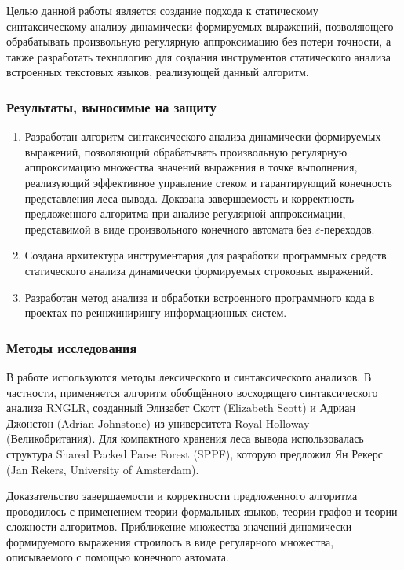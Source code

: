 Целью данной работы является создание подхода к статическому синтаксическому анализу динамически формируемых выражений, позволяющего обрабатывать произвольную регулярную аппроксимацию без потери точности, а также разработать технологию для создания инструментов статического анализа встроенных текстовых языков, реализующей данный алгоритм.

\subsubsection*{\large{Результаты, выносимые на защиту}}
\begin{enumerate}
    \item Разработан алгоритм синтаксического анализа динамически формируемых выражений, позволяющий обрабатывать произвольную регулярную аппроксимацию множества значений выражения в точке выполнения, реализующий 
    эффективное управление стеком и гарантирующий конечность представления леса вывода. Доказана завершаемость и корректность предложенного алгоритма при анализе регулярной аппроксимации, представимой в виде произвольного конечного автомата без $\varepsilon$-переходов. 
    \item Создана архитектура инструментария для разработки программных средств статического анализа динамически формируемых строковых выражений.
    \item Разработан метод анализа и обработки встроенного программного кода в проектах по реинжинирингу информационных систем. 
\end{enumerate}

\subsubsection*{\large{Методы исследования}}

В работе используются методы лексического и синтаксического анализов. В частности, применяется алгоритм обобщённого восходящего синтаксического анализа RNGLR, созданный Элизабет Скотт (Elizabeth Scott) и Адриан Джонстон (Adrian Johnstone) из университета Royal Holloway (Великобритания). Для компактного хранения леса вывода использовалась структура Shared Packed Parse Forest (SPPF), которую предложил Ян Рекерс (Jan Rekers, University of Amsterdam).

Доказательство завершаемости и корректности предложенного алгоритма проводилось с применением теории формальных языков, теории графов и теории сложности алгоритмов. Приближение множества значений динамически формируемого выражения строилось в виде регулярного множества, описываемого с помощью конечного автомата.

